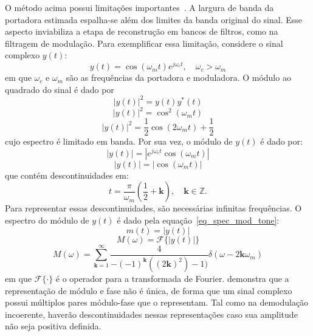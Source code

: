 O método acima possui limitações importantes~\cite{schimmel2007}. A largura de
banda da portadora estimada espalha-se além dos limites da banda original do
sinal. Esse aspecto inviabiliza a etapa de reconstrução em bancos de filtros,
como na filtragem de modulação. Para exemplificar essa limitação, considere o
sinal complexo $y(t)$:
\begin{equation}
    y(t) = \cos(\omega_m t) e^{j\omega_c t}, \quad \omega_c > \omega_m 
\end{equation}
em que $\omega_c$ e $\omega_m$ são as frequências da portadora e moduladora. O
módulo ao quadrado do sinal é dado por
\begin{equation}
    |y(t)|^2  = y(t)y^*(t)
\end{equation}
\begin{equation}
    |y(t)|^2 = \cos^2(\omega_m t)
\end{equation}
\begin{equation}
    |y(t)|^2 = \frac{1}{2}\cos(2 \omega_m t) + \frac{1}{2}
\end{equation}
cujo espectro é limitado em banda. Por sua vez, o módulo de $y(t)$ é dado por:
\begin{equation}
   |y(t)| = |e^{j\omega_c t}\cos(\omega_m t)|
\end{equation}
\begin{equation}
    |y(t)| = |\cos(\omega_m t)|
\end{equation}
que contém descontinuidades em:
\begin{equation}
t = \frac{\pi}{\omega_m} (\frac{1}{2}+ \mathbf{k}), \quad \mathbf{k} \in \mathbb{Z} .
\end{equation}
Para representar essas descontinuidades, são necessárias infinitas
frequências. O espectro do módulo de $y(t)$ é dado pela
equação~\ref{eq_spec_mod_tone}:
\begin{equation}
     m(t) = |y(t)|
\end{equation}
\begin{equation}
    M(\omega) = \mathcal{F}\{|y(t)|\}
\end{equation}
\begin{equation} \label{eq_spec_mod_tone}
    M(\omega) = \sum_{\mathbf{k} = 1}^{\infty}\frac{4}{-(-1)^\mathbf{k} ((2\mathbf{k})^2) - 1)} \delta(\omega - 2 \mathbf{k} \omega_m)   
\end{equation}
em que $\mathcal{F\{\cdot\}}$ é o operador para a transformada de Fourier.
\citet{cohen1999ambiguity} demonstra que a representação de módulo e fase não é
única, de forma que um sinal complexo possui múltiplos pares módulo-fase que o
representam. Tal como na demodulação incoerente, haverão descontinuidades nessas
representações caso sua amplitude não seja positiva definida.


